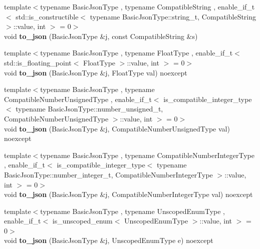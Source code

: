 \begin{DoxyCompactItemize}
\mbox{\label{namespacenlohmann_1_1detail_a7356ed05cdbbb080cee80e1211e1c6c9}} 
{\footnotesize template$<$typename Basic\+Json\+Type , typename Compatible\+String , enable\+\_\+if\+\_\+t$<$ std\+::is\+\_\+constructible$<$ typename Basic\+Json\+Type\+::string\+\_\+t, Compatible\+String $>$\+::value, int $>$  = 0$>$ }\\void {\bfseries to\+\_\+json} (Basic\+Json\+Type \&j, const Compatible\+String \&s)
\item 
\mbox{\label{namespacenlohmann_1_1detail_a22bffdc8bc7e43af380ba2050696b230}} 
{\footnotesize template$<$typename Basic\+Json\+Type , typename Float\+Type , enable\+\_\+if\+\_\+t$<$ std\+::is\+\_\+floating\+\_\+point$<$ Float\+Type $>$\+::value, int $>$  = 0$>$ }\\void {\bfseries to\+\_\+json} (Basic\+Json\+Type \&j, Float\+Type val) noexcept
\item 
\mbox{\label{namespacenlohmann_1_1detail_ae5fd66b5517b3b5a6c6b9fd9f29ba8dc}} 
{\footnotesize template$<$typename Basic\+Json\+Type , typename Compatible\+Number\+Unsigned\+Type , enable\+\_\+if\+\_\+t$<$ is\+\_\+compatible\+\_\+integer\+\_\+type$<$ typename Basic\+Json\+Type\+::number\+\_\+unsigned\+\_\+t, Compatible\+Number\+Unsigned\+Type $>$\+::value, int $>$  = 0$>$ }\\void {\bfseries to\+\_\+json} (Basic\+Json\+Type \&j, Compatible\+Number\+Unsigned\+Type val) noexcept
\item 
\mbox{\label{namespacenlohmann_1_1detail_a91fe576be579c8c2fdd14610605c6dd2}} 
{\footnotesize template$<$typename Basic\+Json\+Type , typename Compatible\+Number\+Integer\+Type , enable\+\_\+if\+\_\+t$<$ is\+\_\+compatible\+\_\+integer\+\_\+type$<$ typename Basic\+Json\+Type\+::number\+\_\+integer\+\_\+t, Compatible\+Number\+Integer\+Type $>$\+::value, int $>$  = 0$>$ }\\void {\bfseries to\+\_\+json} (Basic\+Json\+Type \&j, Compatible\+Number\+Integer\+Type val) noexcept
\item 
\mbox{\label{namespacenlohmann_1_1detail_a1f83504de38ee6f440a77ae898b86a18}} 
{\footnotesize template$<$typename Basic\+Json\+Type , typename Unscoped\+Enum\+Type , enable\+\_\+if\+\_\+t$<$ is\+\_\+unscoped\+\_\+enum$<$ Unscoped\+Enum\+Type $>$\+::value, int $>$  = 0$>$ }\\void {\bfseries to\+\_\+json} (Basic\+Json\+Type \&j, Unscoped\+Enum\+Type e) noexcept

\end{DoxyCompactItemize}
